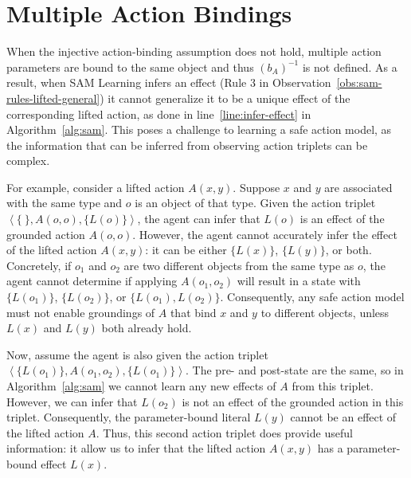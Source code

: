 \documentclass{article}
\newcommand{\tuple}[1]{\ensuremath{\left \langle #1 \right \rangle }}
\newcommand{\liftl}{L}
\newcommand{\lifta}{A}
\begin{document}






\section{Multiple Action Bindings}
When the injective action-binding assumption does not hold, 
multiple action parameters are bound to the same object and thus $(b_\lifta)^{-1}$ is not defined. 
As a result, when SAM Learning infers an effect (Rule 3 in Observation~\ref{obs:sam-rules-lifted-general}) it cannot generalize it to be a unique effect of the corresponding lifted action, as done in line~\ref{line:infer-effect} in Algorithm~\ref{alg:sam}. 
This poses a challenge to learning a safe action model, as the information that can be inferred from observing action triplets can be complex.

For example,
consider a lifted action $\lifta(x,y)$.  
Suppose $x$ and $y$ are associated with the same type and $o$ is an object of that type. 
Given the action triplet 
$\tuple{\{~\}, \lifta(o, o), \{\liftl(o)\}}$, 
the agent can infer that $\liftl(o)$ is an effect of the grounded action $\lifta(o, o)$. 
However, the agent cannot accurately infer the effect of the lifted action $\lifta(x,y)$: it can be
 either $\{\liftl(x)\}$, $\{\liftl(y)\}$, or both. 
 Concretely, if $o_1$ and $o_2$ are two different objects from the same type as $o$, 
 the agent cannot determine if applying $\lifta(o_1,o_2)$ will result in a state with
 $\{\liftl(o_1)\}$, $\{\liftl(o_2)\}$, or $\{\liftl(o_1), \liftl(o_2)\}$.
Consequently, any safe action model must not enable groundings of $\lifta$ that bind $x$ and $y$ to different objects, unless $L(x)$ and $L(y)$ both already hold. 

Now, assume the agent is also given the action triplet 
$\tuple{\{\liftl(o_1)\}, \lifta(o_1, o_2), \{\liftl(o_1)\}}$. 
The pre- and post-state are the same, so in Algorithm~\ref{alg:sam} we cannot learn any new effects of $\lifta$ from this triplet. However, we can infer that $\liftl(o_2)$ is not an effect of the grounded action in this triplet. Consequently, the parameter-bound literal $\liftl(y)$ cannot be an effect of the lifted action $\lifta$. 
Thus, this second action triplet does provide useful information: it allow us to infer that 
the lifted action $\lifta(x,y)$ has a parameter-bound effect $\liftl(x)$. 
\end{document}
